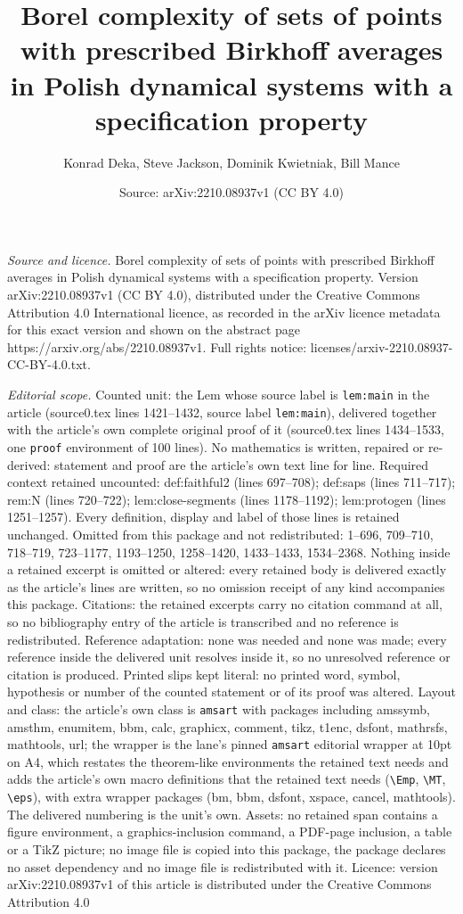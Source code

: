 \documentclass[10pt,a4paper]{amsart}
\title[Borel complexity of sets of points with prescribed Birkhoff ]{Borel complexity of sets of points with prescribed Birkhoff averages in Polish dynamical systems with a specification property}
\author{Konrad Deka, Steve Jackson, Dominik Kwietniak, Bill Mance}
\date{Source: arXiv:2210.08937v1 (CC BY 4.0)}
\begin{document}
\maketitle

\noindent\emph{Source and licence.} Borel complexity of sets of points with prescribed Birkhoff averages in Polish dynamical systems with a specification property. Version arXiv:2210.08937v1 (CC BY 4.0), distributed under the Creative Commons Attribution 4.0 International licence, as recorded in the arXiv licence metadata for this exact version and shown on the abstract page https://arxiv.org/abs/2210.08937v1. Full rights notice: licenses/arxiv-2210.08937-CC-BY-4.0.txt.\par\smallskip

\noindent\textit{Editorial scope.} Counted unit: the Lem whose source label is \texttt{lem:main} in the article (source0.tex lines 1421--1432, source label \texttt{lem:main}), delivered together with the article's own complete original proof of it (source0.tex lines 1434--1533, one \texttt{proof} environment of 100 lines). No mathematics is written, repaired or re-derived: statement and proof are the article's own text line for line. Required context retained uncounted: def:faithful2 (lines 697--708); def:saps (lines 711--717); rem:N (lines 720--722); lem:close-segments (lines 1178--1192); lem:protogen (lines 1251--1257). Every definition, display and label of those lines is retained unchanged. Omitted from this package and not redistributed: 1--696, 709--710, 718--719, 723--1177, 1193--1250, 1258--1420, 1433--1433, 1534--2368. Nothing inside a retained excerpt is omitted or altered: every retained body is delivered exactly as the article's lines are written, so no omission receipt of any kind accompanies this package. Citations: the retained excerpts carry no citation command at all, so no bibliography entry of the article is transcribed and no reference is redistributed. Reference adaptation: none was needed and none was made; every reference inside the delivered unit resolves inside it, so no unresolved reference or citation is produced. Printed slips kept literal: no printed word, symbol, hypothesis or number of the counted statement or of its proof was altered. Layout and class: the article's own class is \texttt{amsart} with packages including amssymb, amsthm, enumitem, bbm, calc, graphicx, comment, tikz, t1enc, dsfont, mathrsfs, mathtools, url; the wrapper is the lane's pinned \texttt{amsart} editorial wrapper at 10pt on A4, which restates the theorem-like environments the retained text needs and adds the article's own macro definitions that the retained text needs (\texttt{\textbackslash Emp}, \texttt{\textbackslash MT}, \texttt{\textbackslash eps}), with extra wrapper packages (bm, bbm, dsfont, xspace, cancel, mathtools). The delivered numbering is the unit's own. Assets: no retained span contains a figure environment, a graphics-inclusion command, a PDF-page inclusion, a table or a TikZ picture; no image file is copied into this package, the package declares no asset dependency and no image file is redistributed with it. Licence: version arXiv:2210.08937v1 of this article is distributed under the Creative Commons Attribution 4.0 
\end{document}
